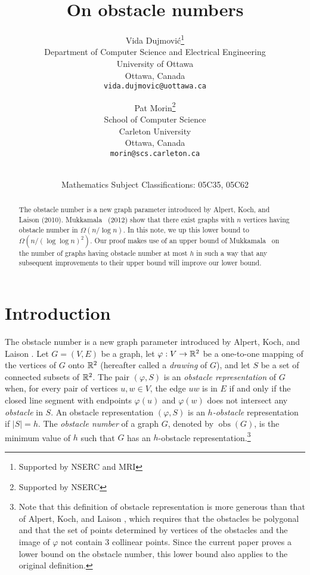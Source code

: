 \documentclass[12pt]{article}
\title{\bf On obstacle numbers}
\author{Vida Dujmovi\'c\thanks{Supported by NSERC and MRI} \\
        {\small Department of Computer Science and Electrical Engineering}\\[-0.8ex]
        {\small University of Ottawa}\\[-0.8ex]
        {\small Ottawa, Canada} \\
        {\small\tt vida.dujmovic@uottawa.ca}\\
        \and
        Pat Morin\thanks{Supported by NSERC}\\
        {\small School of Computer Science}\\[-0.8ex]
        {\small Carleton University}\\[-0.8ex]
        {\small Ottawa, Canada} \\
        {\small\tt morin@scs.carleton.ca}}
\date{\dateline{May 1, 2014}{Apr 5, 2015}\\
\small Mathematics Subject Classifications: 05C35, 05C62}
\DeclareMathOperator{\obs}{obs}
\renewcommand{\note}[1]{}
\begin{document}
\maketitle

\begin{abstract}
The obstacle number is a new graph parameter introduced by Alpert, Koch,
and Laison (2010).  Mukkamala \etal\ (2012) show that there exist graphs
with $n$ vertices having obstacle number in $\Omega(n/\log n)$. In this
note, we up this lower bound to $\Omega(n/(\log\log n)^2)$.  Our proof
makes use of an upper bound of Mukkamala \etal\ on the number of graphs
having obstacle number at most $h$ in such a way that any subsequent
improvements to their upper bound will improve our lower bound.
\end{abstract}


\section{Introduction}

The obstacle number is a new graph parameter introduced by Alpert, Koch,
and Laison \cite{alpert.koch.ea:obstacle}.  Let $G=(V,E)$ be a graph,
let $\varphi:V\to \mathbb{R}^2$ be a one-to-one mapping of the vertices of
$G$ onto $\mathbb{R}^2$ (hereafter called a \emph{drawing} of $G$), and let $S$
be a set of connected subsets of $\mathbb{R}^2$.  The pair $(\varphi,S)$ is an
\emph{obstacle representation} of $G$ when, for every pair of vertices
$u,w\in V$, the edge $uw$ is in $E$ if and only if the closed line
segment with endpoints $\varphi(u)$ and $\varphi(w)$ does not intersect
any \emph{obstacle} in $S$.\note{Changing open to closed handles obstacles
that sneak through vertices.}  An obstacle representation $(\varphi,S)$
is an \emph{$h$-obstacle} representation if $|S|=h$.  The \emph{obstacle
number} of a graph $G$, denoted by $\obs(G)$, is the minimum value of $h$
such that $G$ has an $h$-obstacle representation.\footnote{Note that
this definition of obstacle representation is more generous than that of Alpert, Koch, and Laison \cite{alpert.koch.ea:obstacle}, which requires that the obstacles be polygonal and that the
set of points determined by vertices of the obstacles and the image of $\varphi$ not contain 3 collinear points. Since the current
paper proves a lower bound on the obstacle number, this lower bound
also applies to the original definition.}
\note{Obstacles that intersect each other is fine.}
\note{Changed $w(n)$ to $\obs(n)$}
\end{document}
